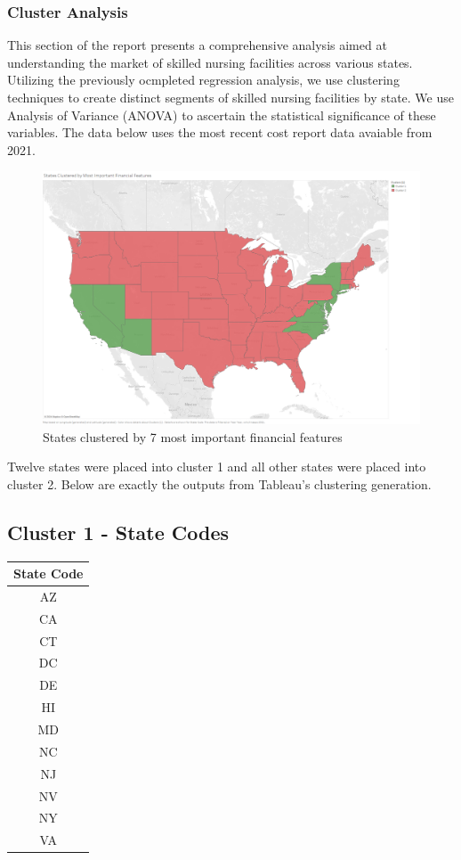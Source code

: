 \documentclass{article}
\theoremstyle{mytheoremstyle}
\theoremstyle{mytheoremstyle}
\theoremstyle{myproblemstyle}
\begin{document}
\subsubsection{Cluster Analysis}
This section of the report presents a comprehensive analysis aimed at understanding the market of skilled nursing facilities across various states. Utilizing the previously ocmpleted regression analysis, we use clustering techniques to create distinct segments of skilled nursing facilities by state. We use Analysis of Variance (ANOVA) to ascertain the statistical significance of these variables. The data below uses the most recent cost report data avaiable from 2021. 
\begin{figure}[htbp]
\centering
\includegraphics[width=\linewidth]{Images/States Clustered by Most Important Financial Features.png}
\caption{States clustered by 7 most important financial features}
\label{fig:Clustering}
\end{figure}

\noindent Twelve states were placed into cluster 1 and all other states were placed into cluster 2. Below are exactly the outputs from Tableau's clustering generation. 

\subsection*{Cluster 1 - State Codes}
\begin{tabular}{@{}c@{}}
\toprule
\textbf{State Code} \\
\midrule
AZ \\
CA \\
CT \\
DC \\
DE \\
HI \\
MD \\
NC \\
NJ \\
NV \\
NY \\
VA \\
\bottomrule
\end{tabular}
\end{document}
